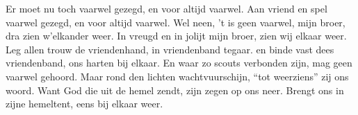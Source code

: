 \beginverse*
Er moet nu toch vaarwel gezegd,
en voor altijd vaarwel.
Aan vriend en spel vaarwel gezegd,
en voor altijd vaarwel.
\endverse
\beginchorus
Wel neen, 't is geen vaarwel,
mijn broer, dra zien w’elkander weer.
In vreugd en in jolijt mijn broer,
zien wij elkaar weer.
\endchorus
\beginverse*
Leg allen trouw de vriendenhand,
in vriendenband tegaar.
en binde vast dees vriendenband,
ons harten bij elkaar.
\endverse
\beginverse*
En waar zo scouts verbonden zijn,
mag geen vaarwel gehoord.
Maar rond den lichten wachtvuurschijn,
“tot weerziens” zij ons woord.
\endverse
\beginverse*
Want God die uit de hemel zendt, zijn zegen op ons neer.
Brengt ons in zijne hemeltent,
eens bij elkaar weer.
\endverse
\endsong 